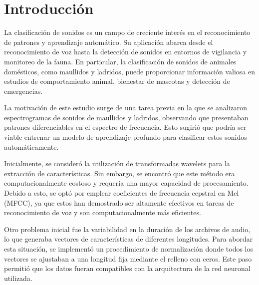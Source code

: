 \documentclass[journal]{IEEEtran}
\begin{document}



\section{Introducción}
% 
% 
% 
% 
\IEEEPARstart
{L}{a} clasificación de sonidos es un campo de creciente interés en el reconocimiento de patrones y aprendizaje automático. Su aplicación abarca desde el reconocimiento de voz hasta la detección de sonidos en entornos de vigilancia y monitoreo de la fauna. En particular, la clasificación de sonidos de animales domésticos, como maullidos y ladridos, puede proporcionar información valiosa en estudios de comportamiento animal, bienestar de mascotas y detección de emergencias.

La motivación de este estudio surge de una tarea previa en la que se analizaron espectrogramas de sonidos de maullidos y ladridos, observando que presentaban patrones diferenciables en el espectro de frecuencia. Esto sugirió que podría ser viable entrenar un modelo de aprendizaje profundo para clasificar estos sonidos automáticamente.

Inicialmente, se consideró la utilización de transformadas wavelets para la extracción de características. Sin embargo, se encontró que este método era computacionalmente costoso y requería una mayor capacidad de procesamiento. Debido a esto, se optó por emplear coeficientes de frecuencia cepstral en Mel (MFCC), ya que estos han demostrado ser altamente efectivos en tareas de reconocimiento de voz y son computacionalmente más eficientes.

Otro problema inicial fue la variabilidad en la duración de los archivos de audio, lo que generaba vectores de características de diferentes longitudes. Para abordar esta situación, se implementó un procedimiento de normalización donde todos los vectores se ajustaban a una longitud fija mediante el relleno con ceros. Este paso permitió que los datos fueran compatibles con la arquitectura de la red neuronal utilizada.
\end{document}
